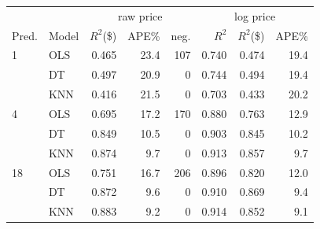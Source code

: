 \begin{tabular}{@{}ll|rrr|rrr@{}}
\toprule
 & & \multicolumn{3}{c|}{raw price} & \multicolumn{3}{c}{log price} \\ Pred. & Model & $R^2$(\$) & APE\% & neg. & $R^2$ & $R^2$(\$) & APE\% \\
\midrule
1 & OLS & 0.465 & 23.4 & 107 & 0.740 & 0.474 & 19.4 \\
 & DT & 0.497 & 20.9 & 0 & 0.744 & 0.494 & 19.4 \\
 & KNN & 0.416 & 21.5 & 0 & 0.703 & 0.433 & 20.2 \\
\midrule
4 & OLS & 0.695 & 17.2 & 170 & 0.880 & 0.763 & 12.9 \\
 & DT & 0.849 & 10.5 & 0 & 0.903 & 0.845 & 10.2 \\
 & KNN & 0.874 & 9.7 & 0 & 0.913 & 0.857 & 9.7 \\
\midrule
18 & OLS & 0.751 & 16.7 & 206 & 0.896 & 0.820 & 12.0 \\
 & DT & 0.872 & 9.6 & 0 & 0.910 & 0.869 & 9.4 \\
 & KNN & 0.883 & 9.2 & 0 & 0.914 & 0.852 & 9.1 \\
\bottomrule
\end{tabular}
